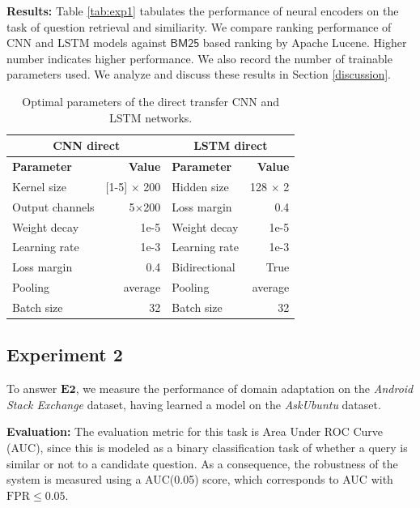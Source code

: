 \documentclass{sigkddExp}
\begin{document}
\textbf{Results:}
Table \ref{tab:exp1} tabulates the performance of neural encoders on the task of question retrieval and similiarity. We compare ranking performance of CNN and LSTM models against $\textsf{BM25}$ based ranking by Apache Lucene. Higher number indicates higher performance. We also record the number of trainable parameters used. We analyze and discuss these results in Section \ref{discussion}.


\begin{table}[h]
\begin{tabularx}{\columnwidth}{l|r|l|r}
      \multicolumn{2}{c|}{\textbf{CNN direct}}
     & \multicolumn{2}{c}{\textbf{LSTM direct}}
     \\
     \toprule
     \textbf{Parameter}
     & \textbf{Value}
     & \textbf{Parameter}
     & \textbf{Value}
     \\
     \midrule
     Kernel size
     & [1-5] $\times$ 200
     & Hidden size
     & 128 $\times$ 2
     \\
     Output channels
     & 5$\times$200
     & Loss margin
     & 0.4
     \\
     Weight decay
     & 1e-5 
     & Weight decay
     & 1e-5 
     \\
     Learning rate
     & 1e-3
     & Learning rate
     & 1e-3
     \\
     Loss margin
     & 0.4
     & Bidirectional
     & True
     \\
     Pooling
     & average
     & Pooling
     & average
     \\
     Batch size
     & 32
     & Batch size
     & 32
\end{tabularx}
\caption{Optimal parameters of the direct transfer CNN and LSTM networks.}
\label{tab:param_direct}
\end{table}



\subsection{Experiment 2} 
To answer $\mathbf{E2}$, we measure the performance of domain adaptation on the \textit{Android Stack Exchange} dataset, having learned a model on the \textit{AskUbuntu} dataset.

\textbf{Evaluation:} The evaluation metric for this task is Area Under ROC Curve (AUC), since this is modeled as a binary classification task of whether a query is similar or not to a candidate question. As a consequence, the robustness of the system is measured using a AUC(0.05) score, which corresponds to AUC with $\mathrm{FPR} \leq 0.05$.
\end{document}
